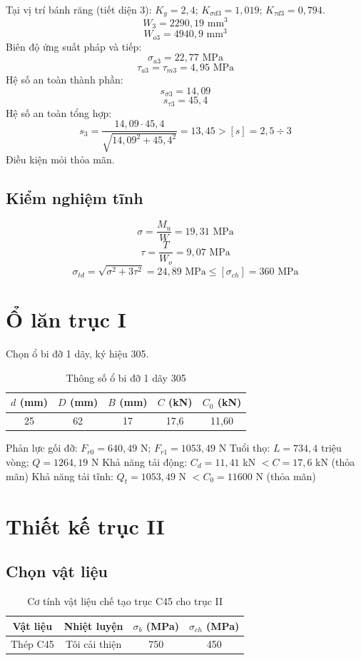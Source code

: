 \documentclass[12pt,a4paper]{report}
\begin{document}
Tại vị trí bánh răng (tiết diện 3): $K_y = 2{,}4$; $K_{\sigma d3} = 1{,}019$; $K_{\tau d3} = 0{,}794$.
$$W_3 = 2290{,}19 \text{ mm}^3$$
$$W_{o3} = 4940{,}9 \text{ mm}^3$$
Biên độ ứng suất pháp và tiếp:
$$\sigma_{a3} = 22{,}77 \text{ MPa}$$
$$\tau_{a3} = \tau_{m3} = 4{,}95 \text{ MPa}$$
Hệ số an toàn thành phần:
$$s_{\sigma 3} = 14{,}09$$
$$s_{\tau 3} = 45{,}4$$
Hệ số an toàn tổng hợp:
$$s_3 = \frac{14{,}09 \cdot 45{,}4}{\sqrt{14{,}09^2 + 45{,}4^2}} = 13{,}45 > [s] = 2{,}5 \div 3$$
Điều kiện mỏi thỏa mãn.

\subsection{Kiểm nghiệm tĩnh}
$$\sigma = \frac{M_{u}}{W} = 19{,}31 \text{ MPa}$$
$$\tau = \frac{T}{W_{o}} = 9{,}07 \text{ MPa}$$
$$\sigma_{td} = \sqrt{\sigma^2 + 3\tau^2} = 24{,}89 \text{ MPa} \leq [\sigma_{ch}] = 360 \text{ MPa}$$

\section{Ổ lăn trục I}
Chọn ổ bi đỡ 1 dãy, ký hiệu 305.
\begin{table}[H]
    \centering
    \caption{Thông số ổ bi đỡ 1 dãy 305}
    \label{tab:4.3}
    \begin{tabular}{|c|c|c|c|c|}
        \hline
        $d$ (mm) & $D$ (mm) & $B$ (mm) & $C$ (kN) & $C_0$ (kN) \\
        \hline
        25 & 62 & 17 & 17,6 & 11,60 \\
        \hline
    \end{tabular}
\end{table}

Phản lực gối đỡ:
$F_{r0} = 640{,}49$ N; $F_{r1} = 1053{,}49$ N
Tuổi thọ: $L = 734{,}4$ triệu vòng; $Q = 1264{,}19$ N
Khả năng tải động: $C_d = 11{,}41$ kN $< C = 17{,}6$ kN (thỏa mãn)
Khả năng tải tĩnh: $Q_t = 1053{,}49$ N $< C_0 = 11600$ N (thỏa mãn)

\section{Thiết kế trục II}

\subsection{Chọn vật liệu}
\begin{table}[H]
    \centering
    \caption{Cơ tính vật liệu chế tạo trục C45 cho trục II}
    \label{tab:4.4}
    \begin{tabular}{|c|c|c|c|}
        \hline
        Vật liệu & Nhiệt luyện & $\sigma_b$ (MPa) & $\sigma_{ch}$ (MPa) \\
        \hline
        Thép C45 & Tôi cải thiện & 750 & 450 \\
        \hline
    \end{tabular}
\end{table}
\end{document}
